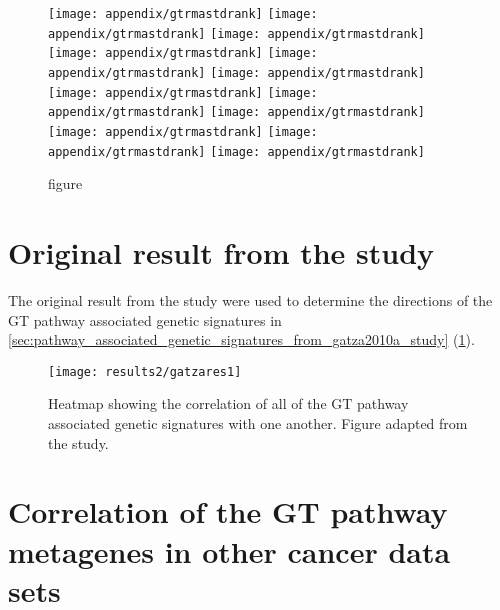 	\begin{figure}[htpb]
		\ContinuedFloat
		\captionsetup{list=off,format=cont}
		\centering
		\texttt{[image: appendix/gtrmastdrank]}
		\texttt{[image: appendix/gtrmastdrank]}
		\texttt{[image: appendix/gtrmastdrank]}\\
		\texttt{[image: appendix/gtrmastdrank]}
		\texttt{[image: appendix/gtrmastdrank]}
		\texttt{[image: appendix/gtrmastdrank]}\\
		\texttt{[image: appendix/gtrmastdrank]}
		\texttt{[image: appendix/gtrmastdrank]}
		\texttt{[image: appendix/gtrmastdrank]}\\
		\texttt{[image: appendix/gtrmastdrank]}
		\texttt{[image: appendix/gtrmastdrank]}
		\texttt{[image: appendix/gtrmastdrank]}\\
		\caption[]{figure}
	\end{figure}

	\newpage

	\section{Original result from the \citet{Gatza2010a} study}
	\label{sec:result_from_gatza2010a_study}

	The original result from the \citet{Gatza2010a} study were used to determine the directions of the GT pathway associated genetic signatures in \cref{sec:pathway_associated_genetic_signatures_from_gatza2010a_study} (\cref{fig:gatza_paper_res}).

	\begin{figure}[htpb]
		\centering
		\texttt{[image: results2/gatzares1]}
		\caption[Original result presented in the \citet{Gatza2010a} study]{Heatmap showing the correlation of all of the GT pathway associated genetic signatures with one another.
		Figure adapted from the \citet{Gatza2010a} study.}
		\label{fig:gatza_paper_res}
	\end{figure}

	\section{Correlation of the GT pathway metagenes in other cancer data sets}
	\label{sec:correlation_of_the_gt_pathway_metagenes_in_other_cancer_data_sets}

